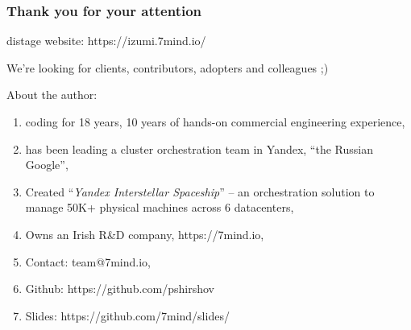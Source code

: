 \documentclass[usenames,dvipsnames]{beamer}
\begin{document}
\begin{frame}
    \frametitle{Thank you for your attention}

    \begin{center}
      distage website: https://izumi.7mind.io/

      We're looking for clients, contributors, adopters and colleagues ;)
    \end{center}

    About the author:
    \begin{enumerate}
        \item coding for 18 years, 10 years of hands-on commercial engineering experience,
        \item has been leading a cluster orchestration team in Yandex, ``the Russian Google'',
        \item Created ``\textit{Yandex Interstellar Spaceship}'' -- an orchestration solution to manage 50K+ physical machines across 6 datacenters,
        \item Owns an Irish R\&D company, https://7mind.io,
        \item Contact: team@7mind.io,
        \item Github: https://github.com/pshirshov
        \item Slides: https://github.com/7mind/slides/
    \end{enumerate}
\end{frame}
\end{document}
